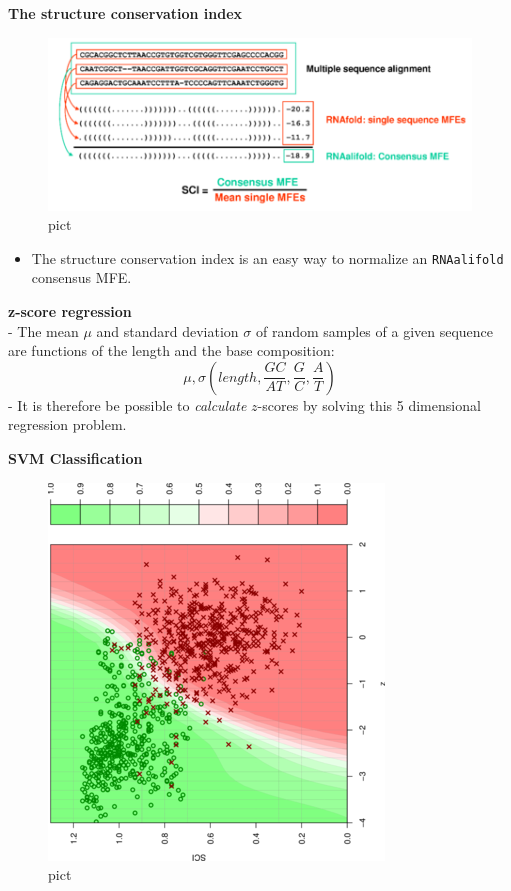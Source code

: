 \documentclass[]{article}
\providecommand{\tightlist}{%
  \setlength{\itemsep}{0pt}\setlength{\parskip}{0pt}}
\begin{document}
\textbf{The structure conservation index}\\

\begin{figure}[htbp]
\centering
\includegraphics{Figs/sci.png}
\caption{pict}
\end{figure}

\begin{itemize}
\tightlist
\item
  The structure conservation index is an easy way to normalize an
  \texttt{RNAalifold} consensus MFE.
\end{itemize}

\textbf{z-score regression}\\
- The mean \(\mu\) and standard deviation \(\sigma\) of random samples
of a given sequence are functions of the length and the base
composition:
\[\mu,\sigma\left( {length,\frac{GC}{AT},\frac{G}{C},\frac{A}{T}} \right)\]
- It is therefore be possible to \emph{calculate} \(z\)-scores by
solving this 5 dimensional regression problem.

\textbf{SVM Classification}\\

\begin{figure}[htbp]
\centering
\includegraphics{Figs/contour.png}
\caption{pict}
\end{figure}
\end{document}
